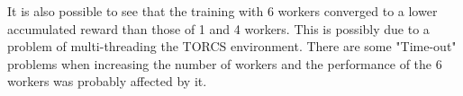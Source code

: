  It is also possible to see that the training with 6 workers converged to a lower accumulated reward than those of 1 and 4 workers. This is possibly due to a problem of multi-threading the TORCS environment. There are some "Time-out" problems when increasing the number of workers and the performance of the 6 workers was probably affected by it.